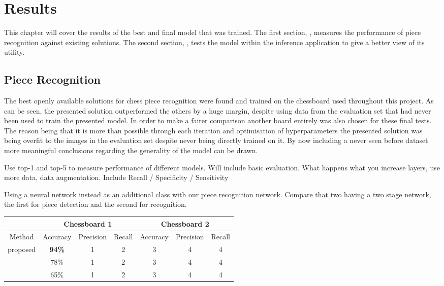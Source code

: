 \chapter{Results}
\label{results}

This chapter will cover the results of the best and final model that was trained.  The first section, , measures the performance
of piece recognition against existing solutions.  The second section, , tests the model within the inference application
to give a better view of its utility.

\section{Piece Recognition}
\label{evaluation}

The best openly available solutions for chess piece recognition were found and trained on the chessboard used throughout this project.
As can be seen, the presented solution outperformed the others by a huge margin, despite using data from the evaluation set that had never
been used to train the presented model.  In order to make a fairer comparison another board entirely was also chosen for these final tests.  The 
reason being that it is more than possible through each iteration and optimisation of hyperparameters the presented solution was being overfit to the 
images in the evaluation set despite never being directly trained on it.  By now including a never seen before dataset more meaningful conclusions
regarding the generality of the model can be drawn.

Use top-1 and top-5 to measure performance of different models.
Will include basic evaluation.  What happens what you increase layers, use more data, data augmentation.
Include Recall / Specificity / Sensitivity



Using a neural network instead as an additional class with our piece recognition network.
Compare that two having a two stage network, the first for piece detection and the second for recognition.

\begin{center}
    \begin{tabular}{|c|c|c|c|c|c|c|}
        \cline{2-7}
        \multicolumn{1}{c|}{} & \multicolumn{3}{|c|}{Chessboard 1} & \multicolumn{3}{|c|}{Chessboard 2} \\
        \hline
        Method & Accuracy & Precision & Recall & Accuracy & Precision & Recall \\
        \hline
        proposed & \textbf{94\%} & 1 & 2 & 3 & 4 & 4 \\
        \cite{} & 78\% & 1 & 2 & 3 & 4 & 4 \\
        \cite{} & 65\% & 1 & 2 & 3 & 4 & 4  \\
        \hline
\end{tabular}
\end{center}

